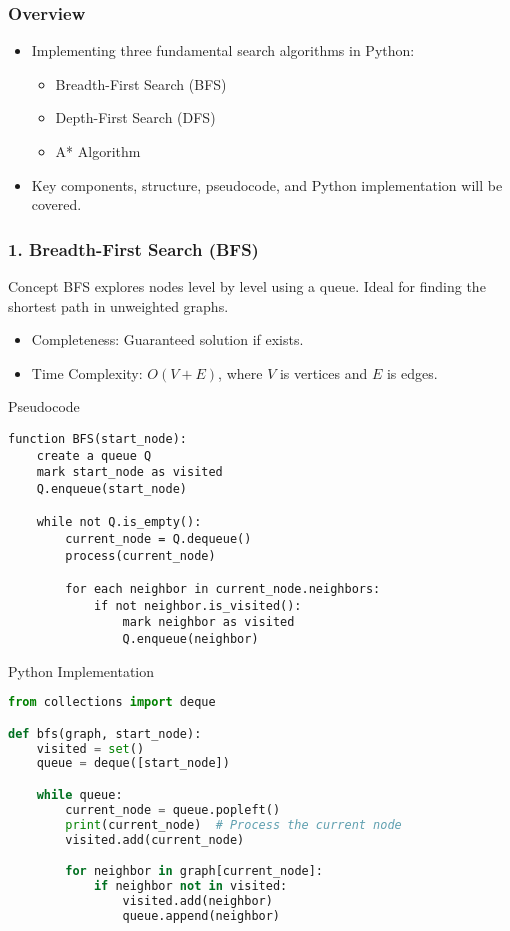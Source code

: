 \documentclass[aspectratio=169]{beamer}
\begin{document}
\begin{frame}
    \titlepage
\end{frame}

\begin{frame}
    \frametitle{Overview}
    \begin{itemize}
        \item Implementing three fundamental search algorithms in Python:
        \begin{itemize}
            \item Breadth-First Search (BFS)
            \item Depth-First Search (DFS)
            \item A* Algorithm
        \end{itemize}
        \item Key components, structure, pseudocode, and Python implementation will be covered.
    \end{itemize}
\end{frame}

\begin{frame}[fragile]
    \frametitle{1. Breadth-First Search (BFS)}
    \begin{block}{Concept}
        BFS explores nodes level by level using a queue. Ideal for finding the shortest path in unweighted graphs.
    \end{block}
    \begin{itemize}
        \item Completeness: Guaranteed solution if exists.
        \item Time Complexity: $O(V + E)$, where $V$ is vertices and $E$ is edges.
    \end{itemize}
    \begin{block}{Pseudocode}
    \begin{lstlisting}
function BFS(start_node):
    create a queue Q
    mark start_node as visited
    Q.enqueue(start_node)
    
    while not Q.is_empty():
        current_node = Q.dequeue()
        process(current_node)
        
        for each neighbor in current_node.neighbors:
            if not neighbor.is_visited():
                mark neighbor as visited
                Q.enqueue(neighbor)
    \end{lstlisting}
    \end{block}
    \begin{block}{Python Implementation}
    \begin{lstlisting}[language=Python]
from collections import deque

def bfs(graph, start_node):
    visited = set()
    queue = deque([start_node])

    while queue:
        current_node = queue.popleft()
        print(current_node)  # Process the current node
        visited.add(current_node)

        for neighbor in graph[current_node]:
            if neighbor not in visited:
                visited.add(neighbor)
                queue.append(neighbor)
    \end{lstlisting}
    \end{block}
\end{frame}
\end{document}
